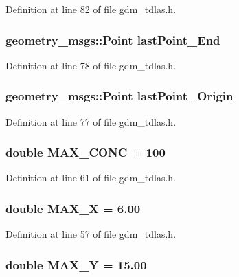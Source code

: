Definition at line 82 of file gdm\_\-tdlas.h.

\subsubsection[{lastPoint\_\-End}]{\setlength{\rightskip}{0pt plus 5cm}geometry\_\-msgs::Point {\bf lastPoint\_\-End}}\label{gdm__tdlas_8h_aa9e3139dbb4679af2b6dfab4559ac517}


Definition at line 78 of file gdm\_\-tdlas.h.

\subsubsection[{lastPoint\_\-Origin}]{\setlength{\rightskip}{0pt plus 5cm}geometry\_\-msgs::Point {\bf lastPoint\_\-Origin}}\label{gdm__tdlas_8h_a8b43179bdb67e5ec9b19d23667f3ab38}


Definition at line 77 of file gdm\_\-tdlas.h.

\subsubsection[{MAX\_\-CONC}]{\setlength{\rightskip}{0pt plus 5cm}double {\bf MAX\_\-CONC} = 100}\label{gdm__tdlas_8h_aeef37ba19f1932a31b8448cc54397c54}


Definition at line 61 of file gdm\_\-tdlas.h.

\subsubsection[{MAX\_\-X}]{\setlength{\rightskip}{0pt plus 5cm}double {\bf MAX\_\-X} = 6.00}\label{gdm__tdlas_8h_a902cb51b772cd4387192501e97bd7198}


Definition at line 57 of file gdm\_\-tdlas.h.

\subsubsection[{MAX\_\-Y}]{\setlength{\rightskip}{0pt plus 5cm}double {\bf MAX\_\-Y} = 15.00}\label{gdm__tdlas_8h_a143bc3c46d0e3fb1e70a2e7da2186b92}


